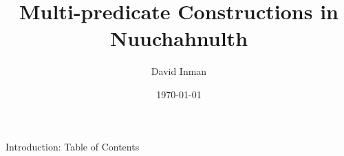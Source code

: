 \documentclass[xcolor=table,usenames,dvipsnames]{beamer}
\title[MPCs in Nuuchahnulth]{Multi-predicate Constructions in Nuuchahnulth} %
\author{David Inman} %
\institute[UW] %
{
University of Washington \\ %
\medskip
\textit{davinman@uw.edu} %
}
\date{\today} %
\begin{document}
\begin{frame}
	\titlepage	
\end{frame}


\begin{frame}{Introduction: Table of Contents}
\tableofcontents
\end{frame}
















	
\end{document}
